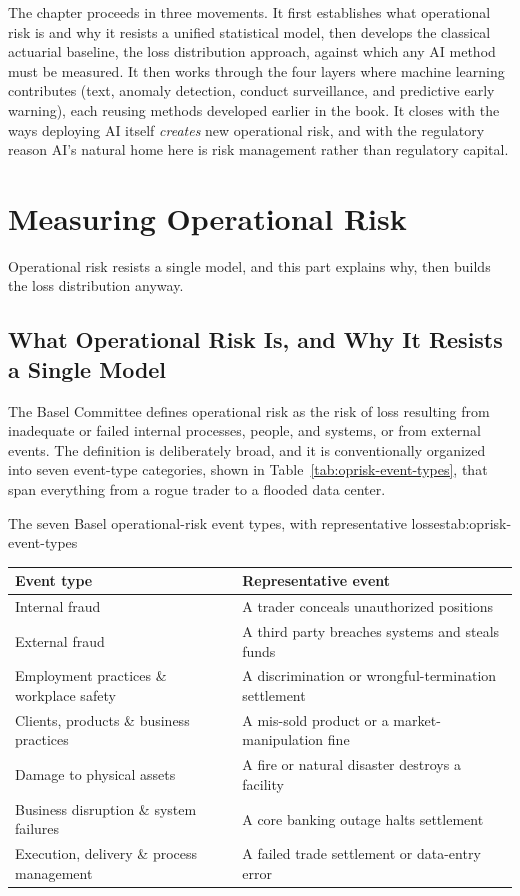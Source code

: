 \documentclass[../ai_in_finance]{subfiles}
\begin{document}
The chapter proceeds in three movements. It first establishes what operational risk is and why it resists a unified statistical model, then develops the classical actuarial baseline, the loss distribution approach, against which any AI method must be measured. It then works through the four layers where machine learning contributes (text, anomaly detection, conduct surveillance, and predictive early warning), each reusing methods developed earlier in the book. It closes with the ways deploying AI itself \emph{creates} new operational risk, and with the regulatory reason AI's natural home here is risk management rather than regulatory capital.

\section{Measuring Operational Risk}

Operational risk resists a single model, and this part explains why, then builds the loss distribution anyway.

\subsection{What Operational Risk Is, and Why It Resists a Single Model}
\label{sec:oprisk-fundamentals}

The Basel Committee defines operational risk as the risk of loss resulting from inadequate or failed internal processes, people, and systems, or from external events. The definition is deliberately broad, and it is conventionally organized into seven event-type categories, shown in Table~\ref{tab:oprisk-event-types}, that span everything from a rogue trader to a flooded data center.

\begin{booktable}[htbp]{The seven Basel operational-risk event types, with representative losses}{tab:oprisk-event-types}
\begin{tabular}{L{6.0cm}L{7.6cm}}
\toprule
Event type & Representative event \\
\midrule
Internal fraud & A trader conceals unauthorized positions \\
External fraud & A third party breaches systems and steals funds \\
Employment practices \& workplace safety & A discrimination or wrongful-termination settlement \\
Clients, products \& business practices & A mis-sold product or a market-manipulation fine \\
Damage to physical assets & A fire or natural disaster destroys a facility \\
Business disruption \& system failures & A core banking outage halts settlement \\
Execution, delivery \& process management & A failed trade settlement or data-entry error \\
\bottomrule
\end{tabular}
\end{booktable}
\end{document}
